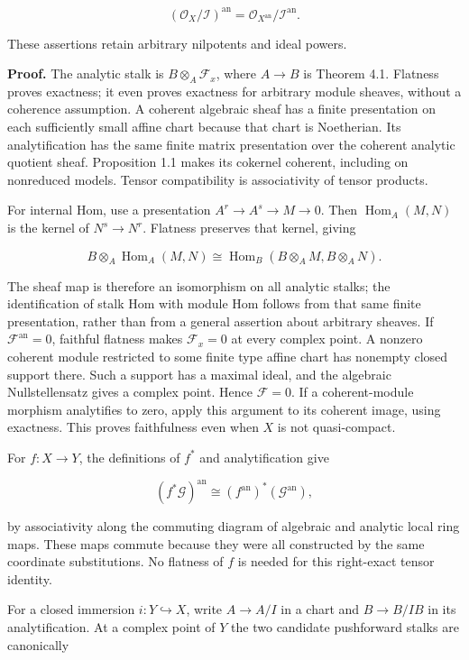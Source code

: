 \documentclass[11pt]{article}
\begin{document}
\[
(\mathcal O_X/\mathcal I)^{\mathrm{an}}
=\mathcal O_{X^{\mathrm{an}}}/\mathcal I^{\mathrm{an}}.
\]

These assertions retain arbitrary nilpotents and ideal powers.

\textbf{Proof.} The analytic stalk is \(B\otimes_A\mathcal F_x\), where
\(A\to B\) is Theorem 4.1. Flatness proves exactness; it even proves
exactness for arbitrary module sheaves, without a coherence assumption.
A coherent algebraic sheaf has a finite presentation on each
sufficiently small affine chart because that chart is Noetherian. Its
analytification has the same finite matrix presentation over the
coherent analytic quotient sheaf. Proposition 1.1 makes its cokernel
coherent, including on nonreduced models. Tensor compatibility is
associativity of tensor products.

For internal Hom, use a presentation \(A^r\to A^s\to M\to0\). Then
\(\operatorname{Hom}_A(M,N)\) is the kernel of \(N^s\to N^r\). Flatness
preserves that kernel, giving

\[
B\otimes_A\operatorname{Hom}_A(M,N)
\cong\operatorname{Hom}_B(B\otimes_A M,B\otimes_A N).
\]

The sheaf map is therefore an isomorphism on all analytic stalks; the
identification of stalk Hom with module Hom follows from that same
finite presentation, rather than from a general assertion about
arbitrary sheaves. If \(\mathcal F^{\mathrm{an}}=0\), faithful flatness
makes \(\mathcal F_x=0\) at every complex point. A nonzero coherent
module restricted to some finite type affine chart has nonempty closed
support there. Such a support has a maximal ideal, and the algebraic
Nullstellensatz gives a complex point. Hence \(\mathcal F=0\). If a
coherent-module morphism analytifies to zero, apply this argument to its
coherent image, using exactness. This proves faithfulness even when
\(X\) is not quasi-compact.

For \(f:X\to Y\), the definitions of \(f^*\) and analytification give

\[
(f^*\mathcal G)^{\mathrm{an}}
\cong(f^{\mathrm{an}})^*(\mathcal G^{\mathrm{an}}),
\]

by associativity along the commuting diagram of algebraic and analytic
local ring maps. These maps commute because they were all constructed by
the same coordinate substitutions. No flatness of \(f\) is needed for
this right-exact tensor identity.

For a closed immersion \(i:Y\hookrightarrow X\), write \(A\to A/I\) in a
chart and \(B\to B/IB\) in its analytification. At a complex point of
\(Y\) the two candidate pushforward stalks are canonically
\end{document}
